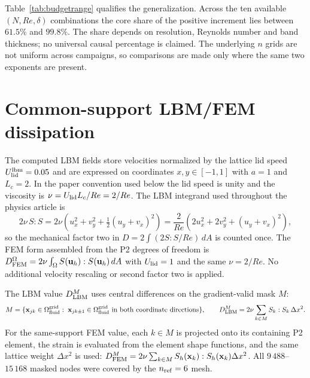 \documentclass[11pt]{article}
\newcommand{\tabbox}[1]{\resizebox{\ifdim\width>\textwidth\textwidth\else\width\fi}{!}{#1}}
\begin{document}
\begin{table}[H]
\centering
\caption{Core share of the $n=4\to8$ increase wherever both exponents exist.
The $Re=100$, $N=256$ increment is unavailable because that campaign has no
$n=8$ field.}




\label{tab:budgetrange}
\tabbox{}
\end{table}
\par


Table~\ref{tab:budgetrange} qualifies the generalization. Across the ten
available $(N,Re,\delta)$ combinations the core share of the positive increment
lies between $61.5\%$ and $99.8\%$. The share depends on resolution, Reynolds
number and band thickness; no universal causal percentage is claimed. The
underlying $n$ grids are not uniform across campaigns, so comparisons are made
only where the same two exponents are present.

\section{Common-support LBM/FEM dissipation}
\label{sec:common_support}

The computed LBM fields store velocities normalized by the lattice lid speed
$U_{\rm lid}^{\rm lbm}=0.05$ and are expressed on coordinates $x,y\in[-1,1]$
with $a=1$ and $L_c=2$. In the paper convention used below the lid speed is
unity and the viscosity is $\nu=U_{\rm lid}L_c/Re=2/Re$. The LBM integrand used throughout the physics article is
\begin{equation}
  2\nu\,S:S = 2\nu\left(u_x^2+v_y^2+\tfrac12(u_y+v_x)^2\right)
            = \frac{2}{Re}\left(2u_x^2+2v_y^2+(u_y+v_x)^2\right),
  \label{eq:mech_factor}
\end{equation}
so the mechanical factor two in $D=2\int(2S:S/Re)\,dA$ is counted once. The
FEM form assembled from the P2 degrees of freedom is
$D_{\rm FEM}^{\Omega}=2\nu\int_\Omega S(\mathbf{u}_h):S(\mathbf{u}_h)\,dA$
with $U_{\rm lid}=1$ and the same $\nu=2/Re$. No additional velocity rescaling
or second factor two is applied.

The LBM value $D_{\rm LBM}^{M}$ uses central differences on the gradient-valid
mask $M$:
\begin{equation}
  M=\{\mathbf{x}_{jk}\in\Omega_{\rm fluid}^{\rm grid}:\;
      \mathbf{x}_{jk\pm1}\in\Omega_{\rm fluid}^{\rm grid}
      \text{ in both coordinate directions}\},
  \qquad
  D_{\rm LBM}^{M}=2\nu\sum_{k\in M}S_{k}:S_{k}\,\Delta x^2 .
  \label{eq:mask}
\end{equation}
For the same-support FEM value, each $k\in M$ is projected onto its containing
P2 element, the strain is evaluated from the element shape functions, and the
same lattice weight $\Delta x^2$ is used:
$D_{\rm FEM}^{M}=2\nu\sum_{k\in M}S_h(\mathbf{x}_k):S_h(\mathbf{x}_k)\Delta x^2$.
All $9\,488$--$15\,168$ masked nodes were covered by the $n_{\rm ref}=6$ mesh.
\end{document}
